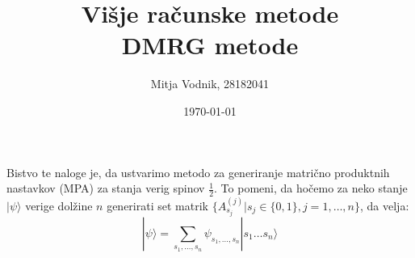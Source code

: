 \documentclass[a4paper]{article}
\newcommand{\half}{\frac{1}{2}}
\newcommand{\ket}[1]{|#1\rangle}
\newcommand{\range}[2]{#1, \ldots, #2}
\newcommand{\seq}[2]{#1 \ldots #2}
\newcommand{\psiCoef}[2]{\psi_{\range{#1}{#2}}}
\newcommand{\mpa}[2]{#1^{(#2)}_{s_#2}}
\begin{document}
    \title{\sc\large Višje računske metode\\
		\bigskip
		\bf\Large DMRG metode}
	\author{Mitja Vodnik, 28182041}
            \date{\today}
	\maketitle

    Bistvo te naloge je, da ustvarimo metodo za generiranje matrično produktnih nastavkov (MPA) za stanja verig spinov $\half$.
    To pomeni, da hočemo za neko stanje $\ket{\psi}$ verige dolžine $n$ generirati set matrik
    $\big\{\mpa{A}{j} | s_j \in \{0, 1\}, j = \range{1}{n}\big\}$, da velja:\\

    \begin{equation}\label{eq1}
        \ket{\psi} = \sum_{\range{s_1}{s_n}} \psiCoef{s_1}{s_n} \ket{\seq{s_1}{s_n}}
    \end{equation}

    \iffalse
    \begin{figure}
        \centering
        \texttt{[image: slika1.pdf]}
        \caption{Odvisnost entropije prepletenosti simetrične biparticije osnovnega stanja od dolžine verige. Dolžine verig na tem grafu so le sode.}
        \label{slika1}
    \end{figure}

    \begin{figure}
        \centering
        \begin{subfigure}{\textwidth}
            \texttt{[image: slika4a.pdf]}
        \end{subfigure}
        \begin{subfigure}{\textwidth}
            \texttt{[image: slika4b.pdf]}
        \end{subfigure}
        \caption{Odvisnost entropije prepletenosti od velikosti blokov biparticije osnovnega stanja s periodičnimi robnimi pogoji.}
        \label{slika4}
    \end{figure}
    \fi
\end{document}
